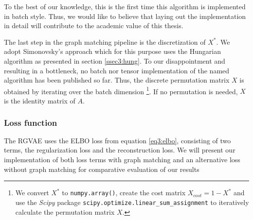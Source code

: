 To the best of our knowledge, this is the first time this algorithm is implemented in batch style. Thus, we would like to believe that laying out the implementation in detail will contribute to the academic value of this thesis.  

The last step in the graph matching pipeline is the discretization of $X^*$. We adopt Simonovsky's \cite{simonovsky_graphvae_2018} approach which for this purpose uses the Hungarian algorithm as presented in section \ref{ssec3:hung}. To our disappointment and resulting in a bottleneck, no batch nor tensor implementation of the named algorithm has been published so far. Thus, the discrete permutation matrix $X$ is obtained by iterating over the batch dimension \footnote{We convert $X^*$ to \texttt{numpy.array()}, create the cost matrix $X_{cost} = 1 - X^*$ and use the \textit{Scipy} package \cite{2020SciPy-NMeth} \texttt{scipy.optimize.linear\_sum\_assignment} to iteratively calculate the permutation matrix $X$.}. If no permutation is needed, $X$ is the identity matrix of $A$. 



\subsubsection{Loss function}
\label{ssec4:loss}

The RGVAE uses the ELBO loss from equation \ref{eq3:elbo}, consisting of two terms, the regularization loss and the reconstruction loss. We will present our implementation of both loss terms with graph matching and an alternative loss without graph matching for comparative evaluation of our results 


